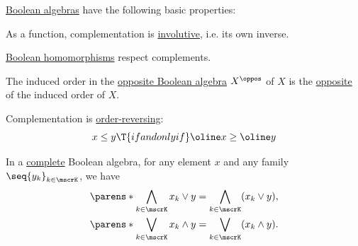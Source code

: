 \begin{proposition}\label{thm:def:boolean_algebra}
  \hyperref[def:boolean_algebra]{Boolean algebras} have the following basic properties:
  \begin{thmenum}
     As a function, complementation is \hyperref[def:categorical_involution]{involutive}, i.e. its own inverse.

     \hyperref[def:boolean_algebra/morphism]{Boolean homomorphisms} respect complements.

     The induced order in the \hyperref[def:boolean_algebra/opposite]{opposite Boolean algebra} \( X^\oppos \) of \( X \) is the \hyperref[def:partially_ordered_set/opposite]{opposite} of the induced order of \( X \).

     Complementation is \hyperref[def:order_function/reversing]{order-reversing}:
    \begin{equation}\label{eq:thm:def:boolean_algebra/complement_contravariant}
      x \leq y \T{if and only if} \oline x \geq \oline y
    \end{equation}

     In a \hyperref[def:complete_lattice]{complete} Boolean algebra, for any element \( x \) and any family \( \seq{ y_k }_{k \in \mscrK} \), we have
    \begin{align}
      \parens*{ \bigwedge_{k \in \mscrK} x_k } \vee y &= \bigwedge_{k \in \mscrK} (x_k \vee y), \label{eq:thm:def:boolean_algebra/distributive/join_over_meet} \\
      \parens*{ \bigvee_{k \in \mscrK} x_k } \wedge y &= \bigvee_{k \in \mscrK} (x_k \wedge y). \label{eq:thm:def:boolean_algebra/distributive/meet_over_join}
    \end{align}
  \end{thmenum}
\end{proposition}
